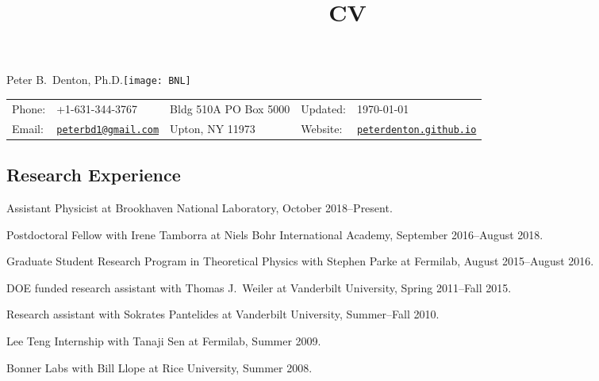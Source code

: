 \documentclass{article}
\title{CV}
\newif\ifhtlatex
\def\name{Peter B.~Denton, Ph.D.}
\renewenvironment{itemize}{
\begin{list}{}{
\setlength{\leftmargin}{.5em}}}{
\end{list}}
\begin{document}
\ifhtlatex
\Tag{TITLE+}{CV}
\fi


\vspace*{-0.5in}
{\huge \name}\hfill\texttt{[image: BNL]}\\
\vspace{0.1in}
\begin{tabular}{ll|l|ll}
Phone: & +1-631-344-3767 & Bldg 510A PO Box 5000 & Updated: & \today\\
Email: & \href{mailto:peterbd1@gmail.com}{\tt peterbd1@gmail.com} & Upton, NY 11973 & Website: & 
\href{http://peterdenton.github.io}{\tt peterdenton.github.io}
\end{tabular}

\subsection*{Research Experience}
\begin{itemize}
\item Assistant Physicist at Brookhaven National Laboratory, October 2018--Present.
\item Postdoctoral Fellow with Irene Tamborra at Niels Bohr International Academy, September 2016--August 2018.
\item Graduate Student Research Program in Theoretical Physics with Stephen Parke at Fermilab, August 2015--August 2016.
\item DOE funded research assistant with Thomas J.~Weiler at Vanderbilt University, Spring 2011--Fall 2015.
\item Research assistant with Sokrates Pantelides at Vanderbilt University, Summer--Fall 2010.
\item Lee Teng Internship with Tanaji Sen at Fermilab, Summer 2009.
\item Bonner Labs with Bill Llope at Rice University, Summer 2008.
\end{itemize}
\end{document}
